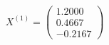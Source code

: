 \documentclass[preview]{standalone}
\begin{document}
\begin{align*}
X^{(1)} = \begin{pmatrix} 1.2000 \\ 0.4667 \\ -0.2167 \end{pmatrix}
\end{align*}
\end{document}
